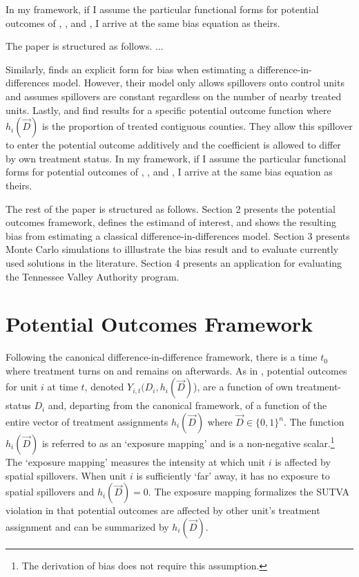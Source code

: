 \documentclass[11pt]{article}
\begin{document}
In my framework, if I assume the particular functional forms for potential outcomes of \citet{Clarke_2017}, \citet{Berg_Streitz_2019}, and \citet{Verbitsky-Savitz_Raudenbush_2012}, I arrive at the same bias equation as theirs. 

The paper is structured as follows. ...




Similarly, \citet{Clarke_2017} finds an explicit form for bias when estimating a difference-in-differences model. However, their model only allows spillovers onto control units and assumes spillovers are constant regardless on the number of nearby treated units. Lastly, \citet{Berg_Streitz_2019} and \citet{Verbitsky-Savitz_Raudenbush_2012} find results for a specific potential outcome function where $h_i(\vec{D})$ is the proportion of treated contiguous counties. They allow this spillover to enter the potential outcome additively and the coefficient is allowed to differ by own treatment status. In my framework, if I assume the particular functional forms for potential outcomes of \citet{Clarke_2017}, \citet{Berg_Streitz_2019}, and \citet{Verbitsky-Savitz_Raudenbush_2012}, I arrive at the same bias equation as theirs. 


The rest of the paper is structured as follows. Section 2 presents the potential outcomes framework, defines the estimand of interest, and shows the resulting bias from estimating a classical difference-in-differences model. Section 3 presents Monte Carlo simulations to illlustrate the bias result and to evaluate currently used solutions in the literature. Section 4 presents an application for evaluating the Tennessee Valley Authority program. 



\section{Potential Outcomes Framework}

Following the canonical difference-in-difference framework, there is a time $t_0$ where treatment turns on and remains on afterwards. As in \citet{Vazquez-Bare_2019}, potential outcomes for unit $i$ at time $t$, denoted $Y_{i,t}(D_i, h_i(\vec{D})$), are a function of own treatment-status $D_i$ and,  departing from the canonical framework, of a function of the entire vector of treatment assignments $h_i(\vec{D})$ where $\vec{D} \in \{0,1 \}^n$. The function $h_i(\vec{D})$ is referred to as an `exposure mapping' and is a non-negative scalar.\footnote{The derivation of bias does not require this assumption.} The `exposure mapping' measures the intensity at which unit $i$ is affected by spatial spillovers. When unit $i$ is sufficiently `far' away, it has no exposure to spatial spillovers and $h_i(\vec{D}) = 0$. The exposure mapping formalizes the SUTVA violation in that potential outcomes are affected by other unit's treatment assignment and can be summarized by $h_i(\vec{D})$. 
\end{document}
